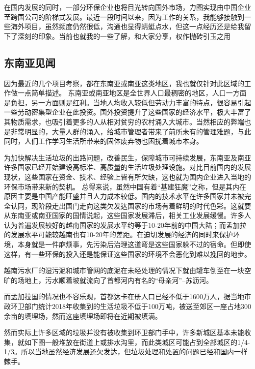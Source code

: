 \documentclass[]{book}
\begin{document}
在国内发展的同时，一部分环保企业也将目光转向国外市场，力图实现由中国企业至跨国公司的阶梯式发展。最近一段时间以来，因为工作的关系，我能够接触到一些海外项目，虽然频度仍然很低，沟通也显得蜻蜓点水，但这一点经历还是给我留下了深刻的印象。当前也就我的一些了解，和大家分享，权作抛砖引玉之用

\hypertarget{ux4e1cux5357ux4e9aux89c1ux95fb}{%
\subsection{东南亚见闻}\label{ux4e1cux5357ux4e9aux89c1ux95fb}}

因为最近的几个项目考察，都在东南亚或南亚这类地区，我也就仅针对此区域的工作做一点简单描述。
东南亚或南亚地区是全世界人口最稠密的地区，人口一方面是负担，另一方面则是红利。当地人均收入较低但劳动力丰富的特点，很容易引起一些劳动密集型企业在此投资。国外投资提升了这些国家的经济水平，极大丰富了其物质需求，也吸引着更多的人从相对贫穷的农村涌入大城市。当然相应的弊端也是非常明显的，大量人群的涌入，给城市管理者带来了前所未有的管理难题，与此同时，人们工作学习生活所带来的固体废弃物也困扰着城市本身。

为加快解决生活垃圾的出路问题，改善民生，保障城市可持续发展，东南亚及南亚许多国家已经开始建设高标准、高质量的生活垃圾处理设施。对比目前国内的发展现状，这些国家在资金、技术、经验上皆有所欠缺，这也就为国内企业进入当地的环保市场带来新的契机。
总得来说，虽然中国有着``基建狂魔''之称，但是其内在原因主要是中国产能旺盛并且人力成本较低。国内的技术水平在许多国家并未被完全认同，现阶段走出国门走向这类欠发达国家的市场有着鲜明的时代色彩。这就要从东南亚或南亚国家的国情说起，这些国家发展滞后，相关工业发展缓慢。许多人认为普遍发展较好的越南国家的发展水平约等于10-20年前的中国大陆；而孟加拉的发展水平可能较越南也有10-20年的差距。在迫切发展的经济的同时来保护环境，本身就是一件麻烦事，先污染后治理这道弯是这些国家躲不过的宿命。但即使这样，有一些环保的投入还是能保证这些国家的环境不会恶化到难以挽回的地步。

越南污水厂的湿污泥和城市管网的底泥在未经处理的情况下就由罐车倒至在一块空旷的场地上，污水顺着坡就流向了首都河内有名的``母亲河''--苏沥河。

而孟加拉国的情况也不容乐观，首都达卡在册人口已经不低于1600万人，据当地市政环卫部门统计2018年收集到的生活垃圾不低于100万吨，被送至郊区一座占地300余亩的填埋场，然而这座填埋场即将在近期被填满。

然而实际上许多区域的垃圾并没有被收集到环卫部门手中，许多新城区基本未能收集，就如下图一般堆放在街道上或排水沟里，而此类城区可能占到全部城区的1/4-1/3。所以当地虽然经济发展还欠发达，但垃圾处理和处置的问题已经和国内一样棘手。
\end{document}
